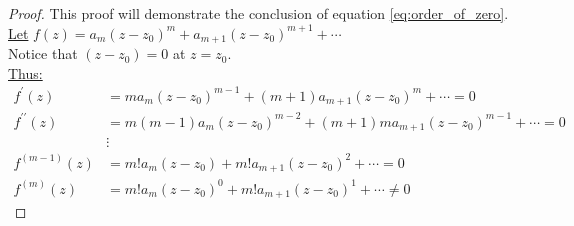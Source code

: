 \begin{proof}
    This proof will demonstrate the conclusion of equation \ref{eq:order_of_zero}. \\
    \underline{Let} $f(z) = a_m(z - z_0)^m + a_{m+1}(z - z_0)^{m+1} + \cdots$ \\
    Notice that $(z - z_0) = 0$ at $z = z_0$. \\
    \underline{Thus:}
    \begin{align*}
        f^{\prime}(z)       & = m a_m(z - z_0)^{m-1} + (m+1)a_{m+1}(z - z_0)^m + \cdots = 0           \\
        f^{\prime\prime}(z) & = m(m-1)a_m(z - z_0)^{m-2} + (m+1)m a_{m+1}(z - z_0)^{m-1} + \cdots = 0 \\
                            & \vdots                                                                  \\
        f^{(m-1)}(z)        & = m! a_m(z - z_0) + m! a_{m+1}(z - z_0)^2 + \cdots = 0                  \\
        f^{(m)}(z)          & = m! a_{m}(z - z_0)^0 + m! a_{m+1}(z - z_0)^1 + \cdots \neq 0
    \end{align*}
\end{proof}

